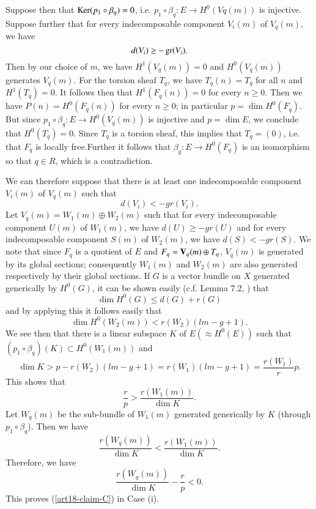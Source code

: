 Suppose then that $\operatorname{\mathrm{Ker}} (p_{1}\circ \beta_{q})=0$, i.e. $p_{1}\circ \beta_{q}:E\to H^{0}(Vq(m))$ is injective. Suppose further that for every indecomposable component $V_{i}(m)$ of $V_{q}(m)$, we have
$$
d(V_{i})\geq -\operatorname{\mathrm{gr}} (V_{i}).
$$
Then by our choice of $m$, we have $H^{1}(V_{q}(m))=0$ and $H^{0}(V_{q}(m))$ generates $V_{q}(m)$. For the torsion sheaf $T_{q}$, we have $T_{q}(n)=T_{q}$ for all $n$ and $H^{1}(T_{q})=0$. It follows then that $H^{1}(F_{q}(n))=0$ for every $n\geq 0$. Then we have $P(n)=H^{0}(F_{q}(n))$ for every $n\geq 0$; in particular $p=\dim H^{0}(F_{q})$. But since $p_{1}\circ \beta_{q}:E\to H^{0}(V_{q}(m))$ is injective and $p=\dim E$, we conclude that $H^{0}(T_{q})=0$. Since $T_{q}$ is a torsion sheaf, this implies that $T_{q}=(0)$, i.e. that $F_{q}$ is locally free.\pageoriginale Further it follows that $\beta_{q}:E\to H^{0}(F_{q})$ is an isomorphism so that $q\in R$, which is a contradiction.

We can therefore suppose that there is at least one indecomposable component $V_{i}(m)$ of $V_{q}(m)$ such that
$$
d(V_{i})<-gr(V_{i}).
$$
Let $V_{q}(m)=W_{1}(m)\oplus W_{2}(m)$ such that for every indecomposable component $U(m)$ of $W_{1}(m)$, we have $d(U)\geq - gr(U)$ and for every indecomposable component $S(m)$ of $W_{2}(m)$, we have $d(S)<-gr(S)$. We note that since $F_{q}$ is a quotient of $E$ and $F_{q}=\mathbf{V}_{q}(m)\oplus T_{q}$, $V_{q}(m)$ is generated by its global sections; consequently $W_{1}(m)$ and $W_{2}(m)$ are also generated respectively by their global sections. If $G$ is a vector bundle on $X$ generated generically by $H^{0}(G)$, it can be shown easily (c.f. Lemma 7.2, \cite{art18-key12}) that
$$
\dim H^{0}(G)\leq d(G)+r(G)
$$
and by applying this it follows easily that
$$
\dim H^{0}(W_{2}(m))<r(W_{2})(lm-g+1).
$$
We see then that there is a linear subspace $K$ of $E(\approx H^{0}(E))$ such that $(p_{1}\circ \beta_{q})(K)\subset H^{0}(W_{1}(m))$ and
$$
\dim K>p-r(W_{2})(lm-g+1)=r(W_{1})(lm-g+1)=\dfrac{r(W_{1})}{r}p.
$$
This shows that
$$
\frac{r}{p}>\frac{r(W_{1}(m))}{\dim K}.
$$
Let $W_{q}(m)$ be the sub-bundle of $W_{1}(m)$ generated generically by $K$ (through $p_{1}\circ \beta_{q}$). Then we have
$$
\dfrac{r(W_{q}(m))}{\dim K}<\dfrac{r(W_{1}(m))}{\dim K}.
$$
Therefore, we have
$$
\frac{r(W_{q}(m))}{\dim K}-\dfrac{r}{p}<0.
$$
This proves (\ref{art18-claim-C}) in Case (i).

